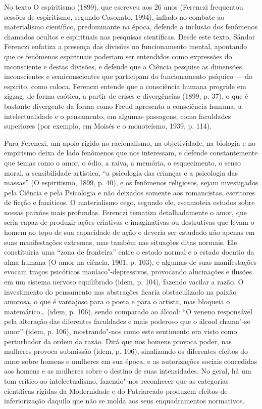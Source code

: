 No texto O espiritismo (1899), que escreveu aos 26 anos (Ferenczi
frequentou sessões de espiritismo, segundo Casonato, 1994), inflado no
combate ao materialismo científico, predominante na época, defende a
inclusão dos fenômenos chamados ocultos e espirituais nas pesquisas
científicas. Desde este texto, Sándor Ferenczi enfatiza a presença das
divisões no funcionamento mental, apontando que os fenômenos espirituais
poderiam ser entendidos como expressões do inconsciente e destas
divisões, e defende que a Ciência pesquise as dimensões inconscientes e
semiconscientes que participam do funcionamento psíquico --- do espirito,
como coloca. Ferenczi entende que a consciência humana progride em
zigzag, de forma caótica, a partir de crises e divergências (1899, p.
37), o que é bastante divergente da forma como Freud apresenta a
consciência humana, a intelectualidade e o pensamento, em algumas
passagens, como faculdades superiores (por exemplo, em Moisés e o
monoteísmo, 1939, p. 114).

Para Ferenczi, um apoio rígido no racionalismo, na objetividade, na
biologia e no empirismo deixa de lado fenômenos que nos interessam, e
defende constantemente que temas como o amor, o ódio, a raiva, a
memória, o esquecimento, o senso moral, a sensibilidade artística, ``a
psicologia das crianças e a psicologia das massas'' (O espiritismo,
1899, p. 40), e os fenômenos religiosos, sejam investigados pela Ciência
e pela Psicologia e não deixados somente aos romancistas, escritores de
ficção e fanáticos. O materialismo cego, segundo ele, escamoteia estudos
sobre nossas paixões mais profundas. Ferenczi tematiza detalhadamente o
amor, que seria capaz de produzir ações criativas e imaginativas ou
destrutivas que levam o homem ao topo de sua capacidade de ação e
deveria ser estudado não apenas em suas manifestações extremas, mas
também nas situações ditas normais. Ele constituiria uma ``zona de
fronteira'' entre o estado normal e o estado doentio da alma humana (O
amor na ciência, 1901, p. 103), e algumas de suas manifestações evocam
traços psicóticos maníaco"-depressivos, provocando alucinações e ilusões
em um sistema nervoso equilibrado (idem, p. 104), fazendo vacilar a
razão. O investimento do pensamento nas abstrações ficaria obstaculizado
na paixão amorosa, o que é vantajoso para o poeta e para o artista, mas
bloqueia o matemático\ldots{} (idem, p. 106), sendo comparado ao álcool: ``O
veneno responsável pela alteração das diferentes faculdades e mais
poderoso que o álcool chama"-se amor'' (idem, p. 106), mostrando"-nos como
este sentimento era visto como perturbador da ordem da razão. Dirá que
nos homens provoca poder, nas mulheres provoca submissão (idem, p. 106),
sinalizando os diferentes efeitos do amor sobre homens e mulheres em sua
época, e as autorizações sociais concedidas aos homens e as mulheres
sobre o destino de suas intensidades. No geral, há um tom crítico ao
intelectualismo, fazendo"-nos reconhecer que as categorias científicas
rígidas da Modernidade e do Patriarcado produzem efeitos de
inferiorização daquilo que não se molda aos seus enquadramentos
normativos.

